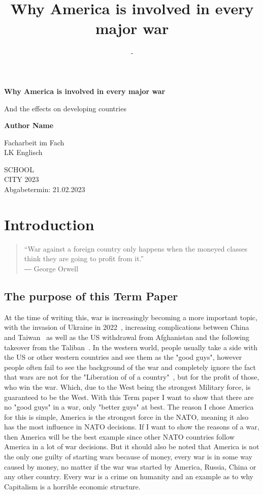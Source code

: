 \documentclass[12pt,a4paper]{article}
\title{Why America is involved in every major war}
\author{-}
\begin{document}
	\begin{center}
		{
		\vspace*{1cm}
		
		\Huge
		\textbf{Why America is involved in every major war}
		
		\vspace{0.5cm}
		\LARGE
		And the effects on developing countries
		
		\vspace{1.5cm}
		
		\textbf{Author Name}
		
		\vspace{1.5cm}
		
		Facharbeit im Fach\\
		LK Englisch
		
		\vfill
		\Large
		SCHOOL\\
		CITY 2023\\
		Abgabetermin: 21.02.2023
		}
	\end{center}
	\newpage
	\tableofcontents
	\newpage
	\section{Introduction}
		\begin{quote}
		“War against a foreign country only happens when the moneyed classes think they are going to profit from it.”\\
		― George Orwell~\cite{orwell-quote}
		\end{quote}
		\subsection{The purpose of this Term Paper}
		At the time of writing this, war is increasingly becoming a more important topic, with the invasion of Ukraine in 2022~\cite{bbc-invasion-ukraine}, increasing complications between China and Taiwan~\cite{bbc-china-taiwan} as well as the US withdrawal from Afghanistan and the following takeover from the Taliban~\cite{cfr-afghanistan}.
		In the western world, people usually take a side with the US or other western countries and see them as the "good guys", however people often fail to see the background of the war and completely ignore the fact that  wars are not for the "Liberation of of a country"~\cite{george-bush-liberation-iraq}, but for the profit of those, who win the war. Which, due to the West being the strongest Military force, is guaranteed to be the West.
		With this Term paper I want to show that there are no "good guys" in a war, only "better guys" at best.
		The reason I chose America for this is simple, America is the strongest force in the NATO\cite{statista-nato-aircraft-strength}, meaning it also has the most influence in NATO decisions. If I want to show the reasons of a war, then America will be the best example since other NATO countries follow America in a lot of war decisions.
		But it should also be noted that America is not the only one guilty of starting wars because of money, every war is in some way caused by money, no matter if the war was started by America, Russia, China or any other country. Every war is a crime on humanity and an example as to why Capitalism is a horrible economic structure.
\end{document}
